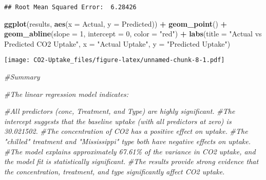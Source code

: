 \documentclass[
]{article}
\newenvironment{Shaded}{\begin{snugshade}}{\end{snugshade}}
\newcommand{\AttributeTok}[1]{\textcolor[rgb]{0.13,0.29,0.53}{#1}}
\newcommand{\CommentTok}[1]{\textcolor[rgb]{0.56,0.35,0.01}{\textit{#1}}}
\newcommand{\DecValTok}[1]{\textcolor[rgb]{0.00,0.00,0.81}{#1}}
\newcommand{\FunctionTok}[1]{\textcolor[rgb]{0.13,0.29,0.53}{\textbf{#1}}}
\newcommand{\NormalTok}[1]{#1}
\newcommand{\SpecialCharTok}[1]{\textcolor[rgb]{0.81,0.36,0.00}{\textbf{#1}}}
\newcommand{\StringTok}[1]{\textcolor[rgb]{0.31,0.60,0.02}{#1}}
\begin{document}
\begin{verbatim}
## Root Mean Squared Error:  6.28426
\end{verbatim}

\begin{Shaded}
\begin{Highlighting}[]
\FunctionTok{ggplot}\NormalTok{(results, }\FunctionTok{aes}\NormalTok{(}\AttributeTok{x =}\NormalTok{ Actual, }\AttributeTok{y =}\NormalTok{ Predicted)) }\SpecialCharTok{+}
  \FunctionTok{geom\_point}\NormalTok{() }\SpecialCharTok{+}
  \FunctionTok{geom\_abline}\NormalTok{(}\AttributeTok{slope =} \DecValTok{1}\NormalTok{, }\AttributeTok{intercept =} \DecValTok{0}\NormalTok{, }\AttributeTok{color =} \StringTok{"red"}\NormalTok{) }\SpecialCharTok{+}
  \FunctionTok{labs}\NormalTok{(}\AttributeTok{title =} \StringTok{"Actual vs Predicted CO2 Uptake"}\NormalTok{, }\AttributeTok{x =} \StringTok{"Actual Uptake"}\NormalTok{, }\AttributeTok{y =} \StringTok{"Predicted Uptake"}\NormalTok{)}
\end{Highlighting}
\end{Shaded}

\texttt{[image: CO2-Uptake\_files/figure-latex/unnamed-chunk-8-1.pdf]}

\begin{Shaded}
\begin{Highlighting}[]
\CommentTok{\#Summary}

\CommentTok{\#The linear regression model indicates:}

\CommentTok{\#All predictors (conc, Treatment, and Type) are highly significant.}
\CommentTok{\#The intercept suggests that the baseline uptake (with all predictors at zero) is 30.021502.}
\CommentTok{\#The concentration of CO2 has a positive effect on uptake.}
\CommentTok{\#The "chilled" treatment and "Mississippi" type both have negative effects on uptake.}
\CommentTok{\#The model explains approximately 67.61\% of the variance in CO2 uptake, and the model fit is statistically significant.}
\CommentTok{\#The results provide strong evidence that the concentration, treatment, and type significantly affect CO2 uptake.}
\end{Highlighting}
\end{Shaded}
\end{document}
